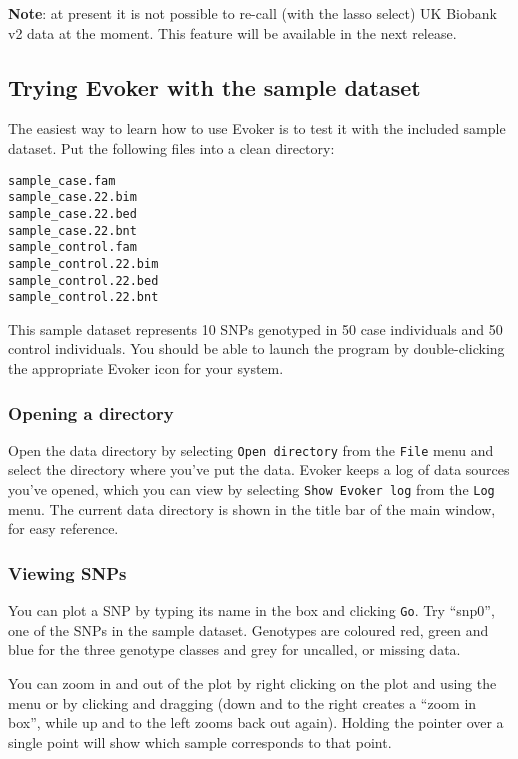 \documentclass{article}
\begin{document}
\textbf{Note}: at present it is not possible to re-call (with the lasso select) UK Biobank v2 data at the moment. This feature will be available in the next release.

\subsection{Trying Evoker with the sample dataset}

The easiest way to learn how to use Evoker is to test it with the included sample dataset. Put the following files into a clean directory:

\begin{verbatim}
sample_case.fam
sample_case.22.bim
sample_case.22.bed
sample_case.22.bnt
sample_control.fam
sample_control.22.bim
sample_control.22.bed
sample_control.22.bnt
\end{verbatim}

This sample dataset represents 10 SNPs genotyped in 50 case individuals and 50 control individuals. You should be able to launch the program by double-clicking the appropriate Evoker icon for your system.

\subsubsection{Opening a directory}
Open the data directory by selecting \texttt{Open directory} from the \texttt{File} menu and select the directory where you've put the data. Evoker keeps a log of data sources you've opened, which you can view by selecting \texttt{Show Evoker log} from the \texttt{Log} menu. The current data directory is shown in the title bar of the main window, for easy reference.

\subsubsection{Viewing SNPs}
You can plot a SNP by typing its name in the box and clicking \texttt{Go}. Try ``snp0'', one of the SNPs in the sample dataset. Genotypes are coloured red, green and blue for the three genotype classes and grey for uncalled, or missing data. 

You can zoom in and out of the plot by right clicking on the plot and using the menu or by clicking and dragging (down and to the right creates a ``zoom in box'', while up and to the left zooms back out again). Holding the pointer over a single point will show which sample corresponds to that point.
\end{document}
